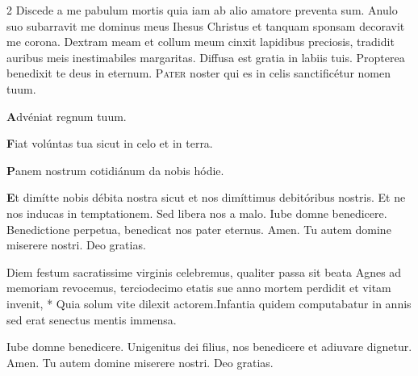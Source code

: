 \begin{multicols}{2}
\newline {}
\newline {} Discede a me pabulum mortis quia iam ab alio amatore preventa sum.
\newline {} Anulo suo subarravit me dominus meus Ihesus Christus et tanquam sponsam decoravit me corona.
\newline {} Dextram meam et collum meum cinxit lapidibus preciosis, tradidit auribus meis inestimabiles margaritas.
\newline \V Diffusa est gratia in labiis tuis. \R Propterea benedixit te deus in eternum. 
\lettrine[lines=2]{\zallmancaps \color{Red} P}{ater} noster qui es in celis sanctificétur nomen tuum.
\begingroup
\setlength{\parindent}{.25em}
\par {\bfseries \color{Blue} A}dvéniat regnum tuum.
\par {\bfseries \color{Red} F}iat volúntas tua sicut in celo et in terra.
\par {\bfseries \color{Blue} P}anem nostrum cotidiánum da nobis hódie.
\par {\bfseries \color{Red} E}t dimítte nobis débita nostra sicut et nos dimíttimus debitóribus nostris.
\aftergroup\clearparshape%
\endgroup
\newline {} Et ne nos inducas in temptationem. \R Sed libera nos a malo.
\newline {} Iube domne benedicere.
\newline {} Benedictione perpetua, benedicat nos pater eternus. \R Amen.
\newline {} Tu autem domine miserere nostri. \R Deo gratias.
\begin{responsory}
{Diem festum sacratissime virginis celebremus, qualiter passa sit beata Agnes ad memoriam revocemus, terciodecimo etatis sue anno mortem perdidit et vitam invenit, * Quia solum vite dilexit actorem.}{Infantia quidem computabatur in annis sed erat senectus mentis immensa.}
\end{responsory}%
\newline {} Iube domne benedicere.
\newline {} Unigenitus dei filius, nos benedicere et adiuvare dignetur. \R Amen. 
\newline {} Tu autem domine miserere nostri. \R Deo gratias.

\end{multicols}
